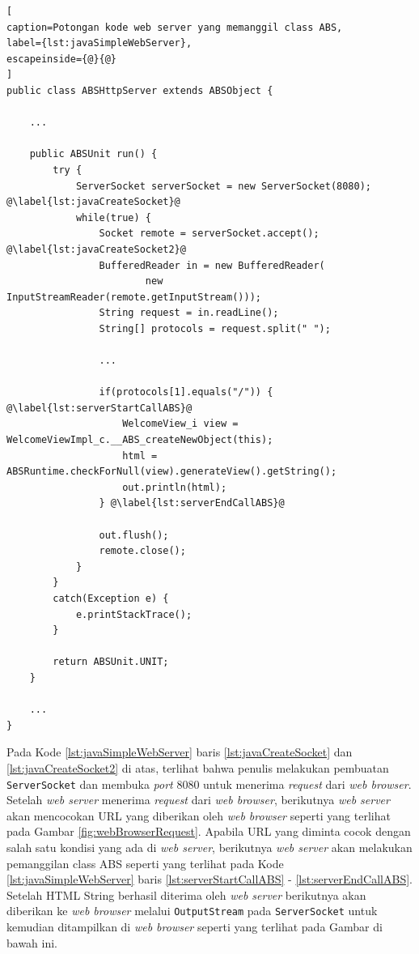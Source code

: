 \begin{lstlisting}[
caption=Potongan kode web server yang memanggil class ABS,
label={lst:javaSimpleWebServer},
escapeinside={@}{@}
]
public class ABSHttpServer extends ABSObject {

    ...
    
    public ABSUnit run() {
        try {
            ServerSocket serverSocket = new ServerSocket(8080); @\label{lst:javaCreateSocket}@
            while(true) {
                Socket remote = serverSocket.accept(); @\label{lst:javaCreateSocket2}@
                BufferedReader in = new BufferedReader(
                        new InputStreamReader(remote.getInputStream()));
                String request = in.readLine();
                String[] protocols = request.split(" ");
                
                ...
                
                if(protocols[1].equals("/")) { @\label{lst:serverStartCallABS}@
                	WelcomeView_i view = WelcomeViewImpl_c.__ABS_createNewObject(this); 
                    html = ABSRuntime.checkForNull(view).generateView().getString();
                    out.println(html);
                } @\label{lst:serverEndCallABS}@
                
                out.flush();
                remote.close();
            }
        }
        catch(Exception e) {
            e.printStackTrace();
        }
        
        return ABSUnit.UNIT;
    }
    
    ...
}
\end{lstlisting}

Pada Kode \ref{lst:javaSimpleWebServer} baris \ref{lst:javaCreateSocket} dan \ref{lst:javaCreateSocket2} di atas, terlihat bahwa penulis melakukan pembuatan \texttt{ServerSocket} dan membuka \textit{port} 8080 untuk menerima \textit{request} dari \textit{web browser}. Setelah \textit{web server} menerima \textit{request} dari \textit{web browser}, berikutnya \textit{web server} akan mencocokan URL yang diberikan oleh \textit{web browser} seperti yang terlihat pada Gambar \ref{fig:webBrowserRequest}. Apabila URL yang diminta cocok dengan salah satu kondisi yang ada di \textit{web server}, berikutnya \textit{web server} akan melakukan pemanggilan class ABS seperti yang terlihat pada Kode \ref{lst:javaSimpleWebServer} baris \ref{lst:serverStartCallABS} - \ref{lst:serverEndCallABS}. Setelah HTML String berhasil diterima oleh \textit{web server} berikutnya akan diberikan ke \textit{web browser} melalui \texttt{OutputStream} pada \texttt{ServerSocket} untuk kemudian ditampilkan di \textit{web browser} seperti yang terlihat pada Gambar di bawah ini.

